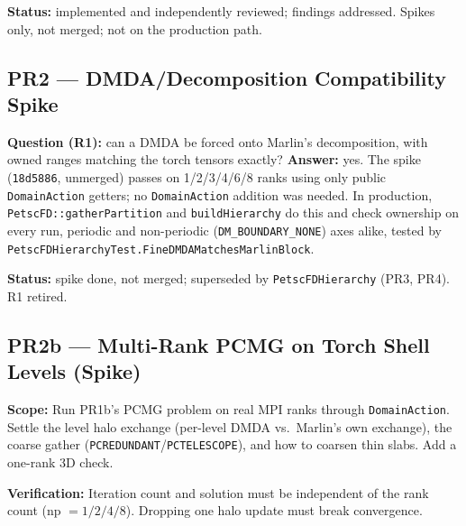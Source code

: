 \documentclass[11pt]{article}
\newcommand{\pr}[2]{\subsection{PR#1 --- #2}}
\newcommand{\status}[1]{\textcolor{marlinteal}{\textbf{Status:}} #1}
\begin{document}
\status{implemented and independently reviewed; findings addressed. Spikes
only, not merged; not on the production path.}

\pr{2}{DMDA/Decomposition Compatibility Spike}
\textbf{Question (R1):} can a DMDA be forced onto Marlin's decomposition,
with owned ranges matching the torch tensors exactly? \textbf{Answer:} yes.
The spike (\texttt{18d5886}, unmerged) passes on 1/2/3/4/6/8 ranks using
only public \texttt{DomainAction} getters; no \texttt{DomainAction} addition
was needed. In production, \texttt{PetscFD::gatherPartition} and
\texttt{buildHierarchy} do this and check ownership on every run, periodic
and non-periodic (\texttt{DM\_BOUNDARY\_NONE}) axes alike, tested by
\texttt{PetscFDHierarchyTest.FineDMDAMatchesMarlinBlock}.

\status{spike done, not merged; superseded by \texttt{PetscFDHierarchy} (PR3, PR4). R1 retired.}

\pr{2b}{Multi-Rank PCMG on Torch Shell Levels (Spike)}
\textbf{Scope:} Run PR1b's PCMG problem on real MPI ranks through
\texttt{DomainAction}. Settle the level halo exchange (per-level DMDA
vs.\ Marlin's own exchange), the coarse gather
(\texttt{PCREDUNDANT}/\texttt{PCTELESCOPE}), and how to coarsen thin slabs.
Add a one-rank 3D check.

\textbf{Verification:} Iteration count and solution must be independent of
the rank count (np $=1/2/4/8$). Dropping one halo update must break
convergence.
\end{document}
